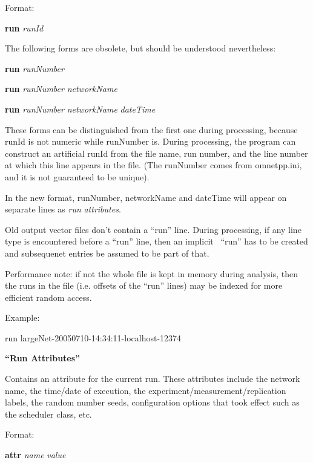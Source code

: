 Format:

\textbf{run} \textit{runId}


\bigskip

The following forms are obsolete, but should be understood nevertheless:

\textbf{run} \textit{runNumber}

\textbf{run} \textit{runNumber} \textit{networkName}

\textbf{run} \textit{runNumber} \textit{networkName} \textit{dateTime}


\bigskip

These forms can be distinguished from the first one during processing,
because runId is not numeric while runNumber is. During processing, the
program can construct an artificial runId from the file name, run
number, and the line number at which this line appears in the file.
(The runNumber comes from omnetpp.ini, and it is not guaranteed to be
unique).

In the new format, runNumber, networkName and dateTime will appear on
separate lines as \textit{run} \textit{attributes}.


\bigskip

Old output vector files don't contain a ``run'' line. During processing,
if any line type is encountered before a ``run'' line, then an implicit
\ ``run'' has to be created and subsequenet entries be assumed to be
part of that.


\bigskip

Performance note: if not the whole file is kept in memory during
analysis, then the runs in the file (i.e. offsets of the ``run'' lines)
may be indexed for more efficient random access.


\bigskip

Example:

{\ttfamily
run
{\textquotedbl}largeNet{}-20050710{}-14:34:11{}-localhost{}-12374{\textquotedbl}}


\bigskip

{\bfseries
``Run Attributes''}

Contains an attribute for the current run. These attributes include the
network name, the time/date of execution, the
experiment/measurement/replication labels, the random number seeds,
configuration options that took effect such as the scheduler class,
etc.


\bigskip

Format:

\textbf{attr} \textit{name} \textit{value}



